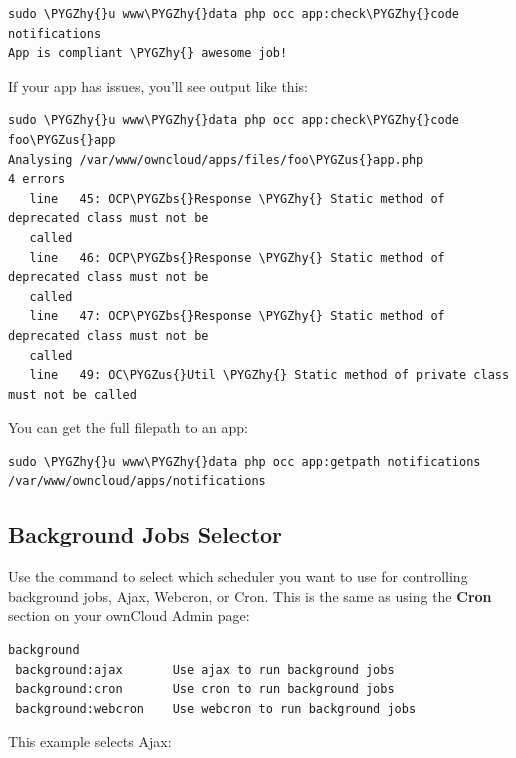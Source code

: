 \documentclass[letterpaper,10pt,english]{sphinxmanual}
\def\PYGZbs{\char`\\}
\def\PYGZus{\char`\_}
\def\PYGZhy{\char`\-}
\begin{document}
\begin{Verbatim}[commandchars=\\\{\}]
sudo \PYGZhy{}u www\PYGZhy{}data php occ app:check\PYGZhy{}code notifications
App is compliant \PYGZhy{} awesome job!
\end{Verbatim}

If your app has issues, you'll see output like this:

\begin{Verbatim}[commandchars=\\\{\}]
sudo \PYGZhy{}u www\PYGZhy{}data php occ app:check\PYGZhy{}code foo\PYGZus{}app
Analysing /var/www/owncloud/apps/files/foo\PYGZus{}app.php
4 errors
   line   45: OCP\PYGZbs{}Response \PYGZhy{} Static method of deprecated class must not be
   called
   line   46: OCP\PYGZbs{}Response \PYGZhy{} Static method of deprecated class must not be
   called
   line   47: OCP\PYGZbs{}Response \PYGZhy{} Static method of deprecated class must not be
   called
   line   49: OC\PYGZus{}Util \PYGZhy{} Static method of private class must not be called
\end{Verbatim}

You can get the full filepath to an app:

\begin{Verbatim}[commandchars=\\\{\}]
sudo \PYGZhy{}u www\PYGZhy{}data php occ app:getpath notifications
/var/www/owncloud/apps/notifications
\end{Verbatim}


\subsection{Background Jobs Selector}
\label{configuration_server/occ_command:background-jobs-selector-label}\label{configuration_server/occ_command:background-jobs-selector}
Use the  command to select which scheduler you want to use for
controlling background jobs, Ajax, Webcron, or Cron. This is the same as using
the \textbf{Cron} section on your ownCloud Admin page:

\begin{Verbatim}[commandchars=\\\{\}]
background
 background:ajax       Use ajax to run background jobs
 background:cron       Use cron to run background jobs
 background:webcron    Use webcron to run background jobs
\end{Verbatim}

This example selects Ajax:
\end{document}
